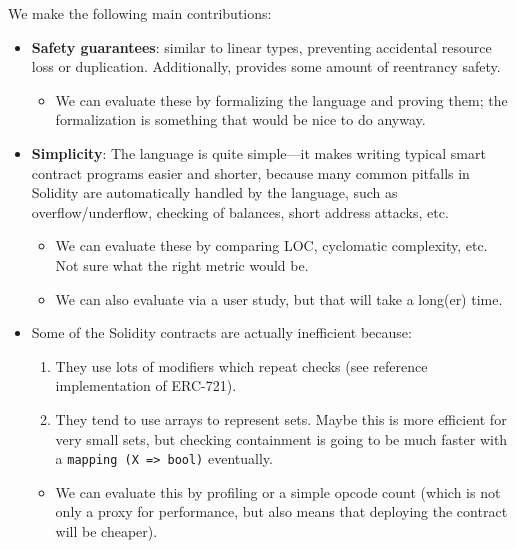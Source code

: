\documentclass[10pt]{article}
\begin{document}
We make the following main contributions:
\begin{itemize}
    \item \textbf{Safety guarantees}: similar to  linear types, preventing accidental resource loss or duplication.
        Additionally, provides some amount of reentrancy safety.

        \begin{itemize}
            \item We can evaluate these by formalizing the language and proving them; the formalization is something that would be nice to do anyway.
        \end{itemize}

    \item \textbf{Simplicity}: The language is quite simple---it makes writing typical smart contract programs easier and shorter, because many common pitfalls in Solidity are automatically handled by the language, such as overflow/underflow, checking of balances, short address attacks, etc.

        \begin{itemize}
            \item We can evaluate these by comparing LOC, cyclomatic complexity, etc.
                Not sure what the right metric would be.

            \item We can also evaluate via a user study, but that will take a long(er) time.
        \end{itemize}

    \item {}
        Some of the Solidity contracts are actually inefficient because:
        \begin{enumerate}
            \item They use lots of modifiers which repeat checks (see reference implementation of ERC-721).
            \item They tend to use arrays to represent sets.
                Maybe this is more efficient for very small sets, but checking containment is going to be much faster with a \lstinline{mapping (X => bool)} eventually.
        \end{enumerate}

        \begin{itemize}
            \item We can evaluate this by profiling or a simple opcode count (which is not only a proxy for performance, but also means that deploying the contract will be cheaper).
        \end{itemize}
\end{itemize}
\end{document}
